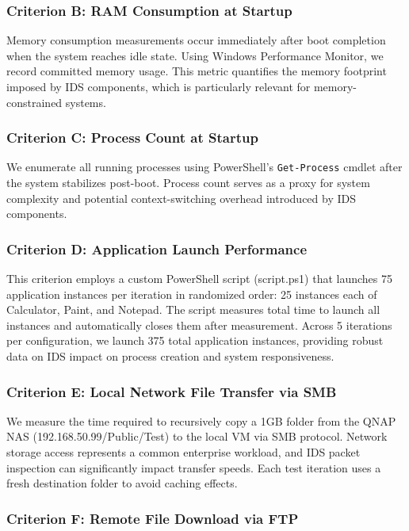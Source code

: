 \documentclass[runningheads,a4paper,english]{llncs}[2022/01/12]
\begin{document}
\subsubsection{Criterion B: RAM Consumption at Startup}

Memory consumption measurements occur immediately after boot completion when the system reaches idle state. Using Windows Performance Monitor, we record committed memory usage. This metric quantifies the memory footprint imposed by IDS components, which is particularly relevant for memory-constrained systems.

\subsubsection{Criterion C: Process Count at Startup}

We enumerate all running processes using PowerShell's \texttt{Get-Process} cmdlet after the system stabilizes post-boot. Process count serves as a proxy for system complexity and potential context-switching overhead introduced by IDS components.

\subsubsection{Criterion D: Application Launch Performance}

This criterion employs a custom PowerShell script (script.ps1) that launches 75 application instances per iteration in randomized order: 25 instances each of Calculator, Paint, and Notepad. The script measures total time to launch all instances and automatically closes them after measurement. Across 5 iterations per configuration, we launch 375 total application instances, providing robust data on IDS impact on process creation and system responsiveness.

\subsubsection{Criterion E: Local Network File Transfer via SMB}

We measure the time required to recursively copy a 1GB folder from the QNAP NAS (192.168.50.99/Public/Test) to the local VM via SMB protocol. Network storage access represents a common enterprise workload, and IDS packet inspection can significantly impact transfer speeds. Each test iteration uses a fresh destination folder to avoid caching effects.

\subsubsection{Criterion F: Remote File Download via FTP}
\end{document}
